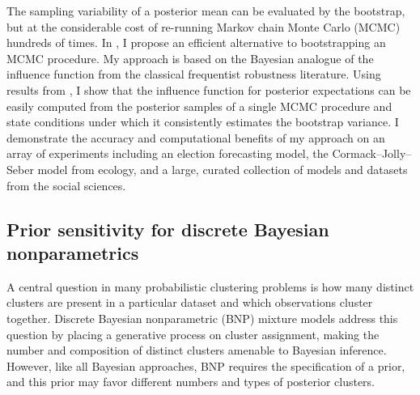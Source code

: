 
The sampling variability of a posterior mean can be evaluated by the bootstrap,
but at the considerable cost of re-running Markov chain Monte Carlo (MCMC)
hundreds of times. In \citet{giordano:2020:stanconbayesij,
giordano:2021:bayesij}, I propose an efficient alternative to bootstrapping an
MCMC procedure.  My approach is based on the Bayesian analogue of the influence
function from the classical frequentist robustness literature.  Using results
from \citet{giordano:2018:covariances, giordano:2019:ij}, I show that the
influence function for posterior expectations can be easily computed from the
posterior samples of a single MCMC procedure and state conditions under which it
consistently estimates the bootstrap variance. I demonstrate the accuracy and
computational benefits of my approach on an array of experiments including an
election forecasting model, the Cormack--Jolly--Seber model from ecology, and a
large, curated collection of models and datasets from the social sciences.



\subsection{Prior sensitivity for discrete Bayesian nonparametrics}
%
A central question in many probabilistic clustering problems is how many
distinct clusters are present in a particular dataset and which observations
cluster together. Discrete Bayesian nonparametric (BNP) mixture models address
this question by placing a generative process on cluster assignment, making the
number and composition of distinct clusters amenable to Bayesian inference.
However, like all Bayesian approaches, BNP requires the specification of a
prior, and this prior may favor different numbers and types of posterior
clusters.

